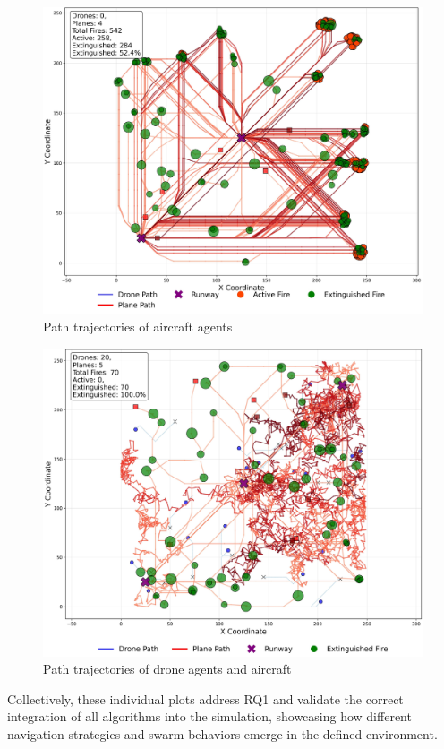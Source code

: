 \documentclass[11pt, a4paper]{article}
\begin{document}
\begin{figure}[H]
    \centering
    \includegraphics[width=0.9\linewidth]{figures/Firefighting_Plane_agent_paths.jpeg}
    \caption{Path trajectories of aircraft agents}
    \label{fig:plane_path}
\end{figure}

\begin{figure}[H]
    \centering
    \includegraphics[width=0.9\linewidth]{figures/Hybrid_agent_paths.jpeg}
    \caption{Path trajectories of drone agents and aircraft}
    \label{fig:hybrid_path}
\end{figure}


Collectively, these individual plots address RQ1 and validate the correct integration of all algorithms into the simulation, showcasing how different navigation strategies and swarm behaviors emerge in the defined environment. 
\end{document}
